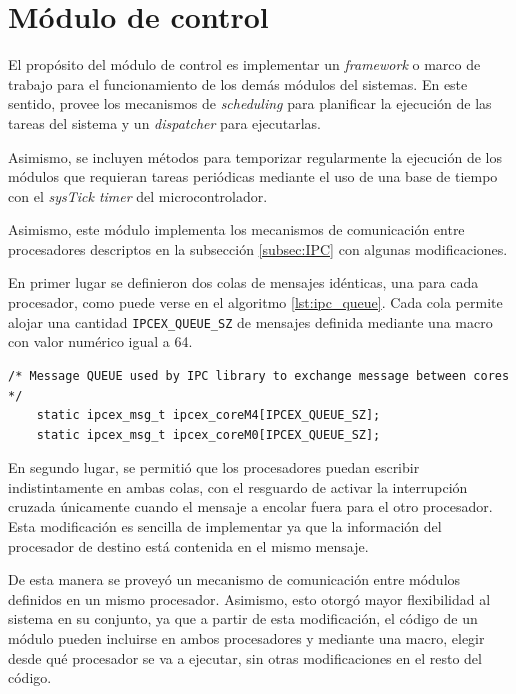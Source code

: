 \clearpage

\section{Módulo de control}
\label{sec:control}

El propósito del módulo de control es implementar un \textit{framework} o marco de trabajo para el funcionamiento de los demás módulos del sistemas.  En este sentido, provee los mecanismos de \textit{scheduling} para planificar la ejecución de las tareas del sistema y un \textit{dispatcher} para ejecutarlas.  

Asimismo, se incluyen métodos para temporizar regularmente la ejecución de los módulos que requieran tareas periódicas mediante el uso de una base de tiempo con el \textit{sysTick timer} del microcontrolador.  

Asimismo, este módulo implementa los mecanismos de comunicación entre procesadores descriptos en la subsección \ref{subsec:IPC} con algunas modificaciones.  

En primer lugar se definieron dos colas de mensajes idénticas, una para cada procesador, como puede verse en el algoritmo \ref{lst:ipc_queue}.  Cada cola permite alojar una cantidad \texttt{IPCEX\_QUEUE\_SZ} de mensajes definida mediante una macro con valor numérico igual a 64.

\vspace{10px}

\begin{lstlisting}[caption={Definición de dos colas de eventos, una para cada procesador.},label={lst:ipc_queue}]
	/* Message QUEUE used by IPC library to exchange message between cores */
	static ipcex_msg_t ipcex_coreM4[IPCEX_QUEUE_SZ];
	static ipcex_msg_t ipcex_coreM0[IPCEX_QUEUE_SZ];
\end{lstlisting}


En segundo lugar, se permitió que los procesadores puedan escribir indistintamente en ambas colas, con el resguardo de activar la interrupción cruzada únicamente cuando el mensaje a encolar fuera para el otro procesador. Esta modificación es sencilla de implementar ya que la información del procesador de destino está contenida en el mismo mensaje.  

De esta manera se proveyó un mecanismo de comunicación entre módulos definidos en un mismo procesador.  Asimismo, esto otorgó mayor flexibilidad al sistema en su conjunto, ya que a partir de esta modificación, el código de un módulo pueden incluirse en ambos procesadores y mediante una macro, elegir desde qué procesador se va a ejecutar, sin otras modificaciones en el resto del código.

